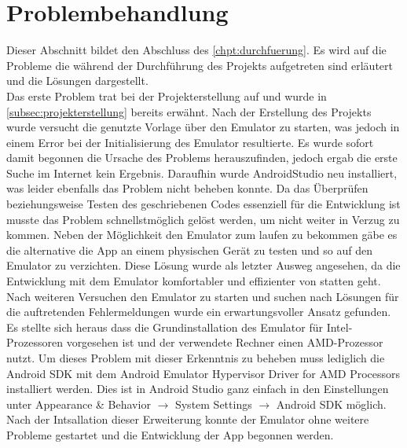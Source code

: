 \section{Problembehandlung}\label{sec:problem}
Dieser Abschnitt bildet den Abschluss des \autoref{chpt:durchfuerung}. Es wird auf die Probleme die während der Durchführung des Projekts aufgetreten sind erläutert und die Lösungen dargestellt.\\
Das erste Problem trat bei der Projekterstellung auf und wurde in \autoref{subsec:projekterstellung} bereits erwähnt. Nach der Erstellung des Projekts wurde versucht die genutzte Vorlage über den Emulator zu starten, was jedoch in einem Error bei der Initialisierung des Emulator resultierte. Es wurde sofort damit begonnen die Ursache des Problems herauszufinden, jedoch ergab die erste Suche im Internet kein Ergebnis. Daraufhin wurde AndroidStudio neu installiert, was leider ebenfalls das Problem nicht beheben konnte. Da das Überprüfen beziehungsweise Testen des geschriebenen Codes essenziell für die Entwicklung ist musste das Problem schnellstmöglich gelöst werden, um nicht weiter in Verzug zu kommen. Neben der Möglichkeit den Emulator zum laufen zu bekommen gäbe es die alternative die App an einem physischen Gerät zu testen und so auf den Emulator zu verzichten. Diese Lösung wurde als letzter Ausweg angesehen, da die Entwicklung mit dem Emulator komfortabler und effizienter von statten geht. Nach weiteren Versuchen den Emulator zu starten und suchen nach Lösungen für die auftretenden Fehlermeldungen wurde ein erwartungsvoller Ansatz gefunden. Es stellte sich heraus dass die Grundinstallation des Emulator für Intel-Prozessoren vorgesehen ist und der verwendete Rechner einen AMD-Prozessor nutzt. Um dieses Problem mit dieser Erkenntnis zu beheben muss lediglich die Android SDK mit dem Android Emulator Hypervisor Driver for AMD Processors installiert werden. Dies ist in Android Studio ganz einfach in den Einstellungen unter Appearance \& Behavior $\rightarrow$ System Settings $\rightarrow$ Android SDK möglich. Nach der Intsallation dieser Erweiterung konnte der Emulator ohne weitere Probleme gestartet und die Entwicklung der App begonnen werden.\\
